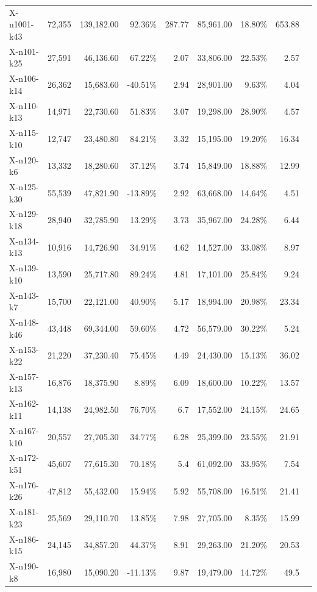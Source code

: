 \documentclass[12pt,a4paper]{article}
\begin{document}
\begin{longtable}{@{}lrrrrrrrr@{}}
    X-n1001-k43 & 72,355 & 139,182.00 & 92.36\% & 287.77 & 85,961.00 & 18.80\% & 653.88 \\
    X-n101-k25 & 27,591 & 46,136.60 & 67.22\% & 2.07 & 33,806.00 & 22.53\% & 2.57 \\
    X-n106-k14 & 26,362 & 15,683.60 & -40.51\% & 2.94 & 28,901.00 & 9.63\% & 4.04 \\
    X-n110-k13 & 14,971 & 22,730.60 & 51.83\% & 3.07 & 19,298.00 & 28.90\% & 4.57 \\
    X-n115-k10 & 12,747 & 23,480.80 & 84.21\% & 3.32 & 15,195.00 & 19.20\% & 16.34 \\
    X-n120-k6 & 13,332 & 18,280.60 & 37.12\% & 3.74 & 15,849.00 & 18.88\% & 12.99 \\
    X-n125-k30 & 55,539 & 47,821.90 & -13.89\% & 2.92 & 63,668.00 & 14.64\% & 4.51 \\
    X-n129-k18 & 28,940 & 32,785.90 & 13.29\% & 3.73 & 35,967.00 & 24.28\% & 6.44 \\
    X-n134-k13 & 10,916 & 14,726.90 & 34.91\% & 4.62 & 14,527.00 & 33.08\% & 8.97 \\
    X-n139-k10 & 13,590 & 25,717.80 & 89.24\% & 4.81 & 17,101.00 & 25.84\% & 9.24 \\
    X-n143-k7 & 15,700 & 22,121.00 & 40.90\% & 5.17 & 18,994.00 & 20.98\% & 23.34 \\
    X-n148-k46 & 43,448 & 69,344.00 & 59.60\% & 4.72 & 56,579.00 & 30.22\% & 5.24 \\
    X-n153-k22 & 21,220 & 37,230.40 & 75.45\% & 4.49 & 24,430.00 & 15.13\% & 36.02 \\
    X-n157-k13 & 16,876 & 18,375.90 & 8.89\% & 6.09 & 18,600.00 & 10.22\% & 13.57 \\
    X-n162-k11 & 14,138 & 24,982.50 & 76.70\% & 6.7 & 17,552.00 & 24.15\% & 24.65 \\
    X-n167-k10 & 20,557 & 27,705.30 & 34.77\% & 6.28 & 25,399.00 & 23.55\% & 21.91 \\
    X-n172-k51 & 45,607 & 77,615.30 & 70.18\% & 5.4 & 61,092.00 & 33.95\% & 7.54 \\
    X-n176-k26 & 47,812 & 55,432.00 & 15.94\% & 5.92 & 55,708.00 & 16.51\% & 21.41 \\
    X-n181-k23 & 25,569 & 29,110.70 & 13.85\% & 7.98 & 27,705.00 & 8.35\% & 15.99 \\
    X-n186-k15 & 24,145 & 34,857.20 & 44.37\% & 8.91 & 29,263.00 & 21.20\% & 20.53 \\
    X-n190-k8 & 16,980 & 15,090.20 & -11.13\% & 9.87 & 19,479.00 & 14.72\% & 49.5 \\

\end{longtable}
\end{document}
